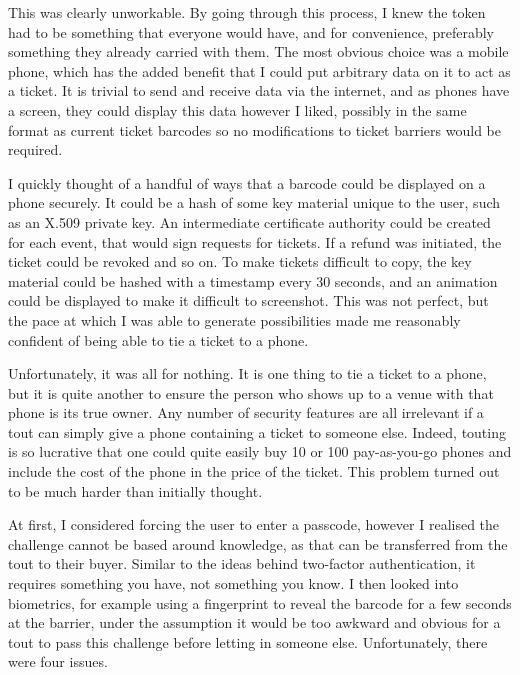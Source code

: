 \documentclass[12pt,a4paper]{bhamdissertation}
\begin{document}
This was clearly unworkable. By going through this process, I knew the token had to be something that everyone would have, and for convenience, preferably something they already carried with them. The most obvious choice was a mobile phone, which has the added benefit that I could put arbitrary data on it to act as a ticket. It is trivial to send and receive data via the internet, and as phones have a screen, they could display this data however I liked, possibly in the same format as current ticket barcodes so no modifications to ticket barriers would be required.

I quickly thought of a handful of ways that a barcode could be displayed on a phone securely. It could be a hash of some key material unique to the user, such as an X.509 private key. An intermediate certificate authority could be created for each event, that would sign requests for tickets. If a refund was initiated, the ticket could be revoked and so on. To make tickets difficult to copy, the key material could be hashed with a timestamp every 30 seconds, and an animation could be displayed to make it difficult to screenshot. This was not perfect, but the pace at which I was able to generate possibilities made me reasonably confident of being able to tie a ticket to a phone.

Unfortunately, it was all for nothing. It is one thing to tie a ticket to a phone, but it is quite another to ensure the person who shows up to a venue with that phone is its true owner. Any number of security features are all irrelevant if a tout can simply give a phone containing a ticket to someone else. Indeed, touting is so lucrative that one could quite easily buy 10 or 100 pay-as-you-go phones and include the cost of the phone in the price of the ticket. This problem turned out to be much harder than initially thought.

At first, I considered forcing the user to enter a passcode, however I realised the challenge cannot be based around knowledge, as that can be transferred from the tout to their buyer. Similar to the ideas behind two-factor authentication, it requires something you have, not something you know. I then looked into biometrics, for example using a fingerprint to reveal the barcode for a few seconds at the barrier, under the assumption it would be too awkward and obvious for a tout to pass this challenge before letting in someone else. Unfortunately, there were four issues.
\end{document}
